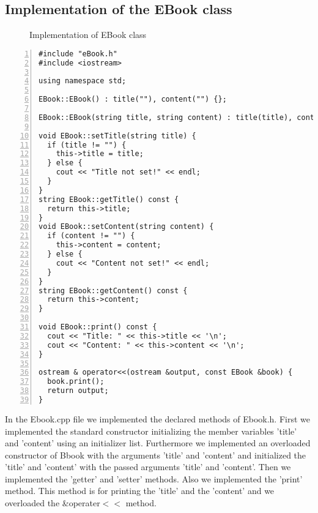 \documentclass{article}
\begin{document}
\subsection{Implementation of the EBook class}
\begin{figure}
  \scriptsize{\caption{Implementation of EBook class}}
\end{figure}
\begin{lstlisting}[basicstyle=\footnotesize\ttfamily, numbers=left, stepnumber=1, numberstyle = \normalsize, caption={My Caption}]
#include "eBook.h"
#include <iostream>

using namespace std;

EBook::EBook() : title(""), content("") {};

EBook::EBook(string title, string content) : title(title), content(content) {};

void EBook::setTitle(string title) {
  if (title != "") {
    this->title = title;
  } else {
    cout << "Title not set!" << endl;
  }
}
string EBook::getTitle() const {
  return this->title;
}
void EBook::setContent(string content) {
  if (content != "") {
    this->content = content;
  } else {
    cout << "Content not set!" << endl;
  }
}
string EBook::getContent() const {
  return this->content;
}

void EBook::print() const {
  cout << "Title: " << this->title << '\n';
  cout << "Content: " << this->content << '\n';
}

ostream & operator<<(ostream &output, const EBook &book) {
  book.print();
  return output;
}
\end{lstlisting}
\normalsize{In the Ebook.cpp file we implemented the declared methods of Ebook.h.
  First we implemented the standard constructor initializing the member variables 'title' and 'content' using an initializer list.
  Furthermore we implemented an overloaded constructor of Bbook with the arguments 'title' and 'content' and initialized the 'title' and 'content' with the passed arguments 'title' and 'content'.
  Then we implemented the 'getter' and 'setter' methods.
Also we implemented the 'print' method. This method is for printing the 'title' and the 'content' and we overloaded the \&operater$<<$ method.}




\end{document}
